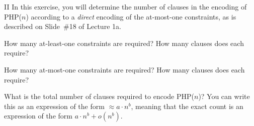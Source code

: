 \newpage

\begin{problem}{II}
In this exercise, you will determine the number of clauses in the
encoding of PHP($n$) according to a {\em direct} encoding of the
at-most-one constraints, as is described on Slide~\#18 of Lecture 1a.

\begin{choice}
\item How many at-least-one constraints are required?  How many clauses does each require?

\item How many at-most-one constraints are required?  How many clauses does each require?
  
\item What is the total number of clauses required to encode PHP($n$)?  You can write this as an expression of the form $\approx a \cdot n^b$, meaning that the exact count is an expression of the form
  $a \cdot n^b + o(n^b)$.


\end{choice}
\end{problem}

\newpage

